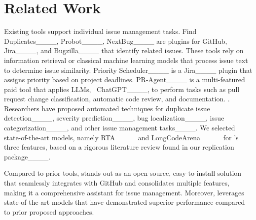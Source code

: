 \section{Related Work}
\label{sec:related_work}

Existing tools support individual issue management tasks. Find Duplicates____, Probot____, NextBug____ are plugins for GitHub, Jira____, and Bugzilla____ that identify related issues. These tools rely on information retrieval or classical machine learning models that process issue text to determine issue similarity. Priority Scheduler____ is a Jira____ plugin that assigns priority based on project deadlines.  PR-Agent____ is a multi-featured paid tool that applies LLMs, \eg\ ChatGPT____, to perform tasks such as pull request change classification, automatic code review, and documentation. . Researchers have proposed automated techniques for duplicate issue detection____, severity prediction____, bug localization____, issue categorization____, and other issue management tasks____. We selected state-of-the-art models, namely RTA____ and LongCodeArena____ for \toolname's three features, based on a rigorous literature review found in our replication package____.

Compared to prior tools, \toolname stands out as an open-source, easy-to-install solution that seamlessly integrates with GitHub and consolidates multiple features, making it a comprehensive assistant for issue management.
Moreover, \toolname leverages state-of-the-art models that have demonstrated superior performance compared to prior proposed approaches.

